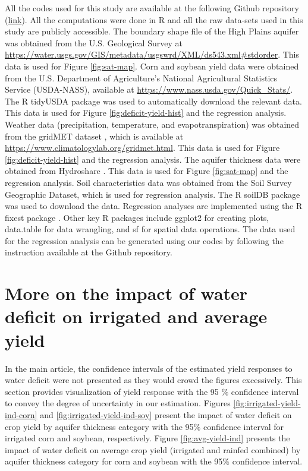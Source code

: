 \documentclass[
]{article}
\begin{document}
All the codes used for this study are available at the following Github repository (\href{https://github.com/tmieno2/Drought-Production-Risk-Aquifer}{link}). All the computations were done in R \citep{R} and all the raw data-sets used in this study are publicly accessible. The boundary shape file of the High Plains aquifer was obtained from the U.S. Geological Survey at \url{https://water.usgs.gov/GIS/metadata/usgswrd/XML/ds543.xml#stdorder}. This data is used for Figure \ref{fig:sat-map}. Corn and soybean yield data were obtained from the U.S. Department of Agriculture's National Agricultural Statistics Service (USDA-NASS), available at \url{https://www.nass.usda.gov/Quick_Stats/}. The R tidyUSDA package \citep{RtidyUSDA} was used to automatically download the relevant data. This data is used for Figure \ref{fig:deficit-yield-hist} and the regression analysis. Weather data (precipitation, temperature, and evapotranspiration) was obtained from the gridMET dataset \citep{Abatzoglou2013}, which is available at \url{https://www.climatologylab.org/gridmet.html}. This data is used for Figure \ref{fig:deficit-yield-hist} and the regression analysis. The aquifer thickness data were obtained from Hydroshare \citep{haacker2023}. This data is used for Figure \ref{fig:sat-map} and the regression analysis. Soil characteristics data was obtained from the Soil Survey Geographic Dataset, which is used for regression analysis. The R soilDB package \citep{Rsoildb} was used to download the data. Regression analyses are implemented using the R fixest package \citep{Rfixest}. Other key R packages include ggplot2 \citep{Rggplot2} for creating plots, data.table \citep{Rdatatable} for data wrangling, and sf \citep{Rsf} for spatial data operations. The data used for the regression analysis can be generated using our codes by following the instruction available at the Github repository.

\clearpage

\hypertarget{appendix-appendix}{%
\appendix}


\hypertarget{reg-conf}{%
\section{More on the impact of water deficit on irrigated and average yield}\label{reg-conf}}

\setcounter{figure}{0}
\renewcommand{\thefigure}{A.\arabic{figure}}

In the main article, the confidence intervals of the estimated yield responses to water deficit were not presented as they would crowd the figures excessively. This section provides visualization of yield response with the 95 \(\%\) confidence interval to convey the degree of uncertainty in our estimation. Figures \ref{fig:irrigated-yield-ind-corn} and \ref{fig:irrigated-yield-ind-soy} present the impact of water deficit on crop yield by aquifer thickness category with the 95\(\%\) confidence interval for irrigated corn and soybean, respectively. Figure \ref{fig:avg-yield-ind} presents the impact of water deficit on average crop yield (irrigated and rainfed combined) by aquifer thickness category for corn and soybean with the 95\(\%\) confidence interval.
\end{document}
